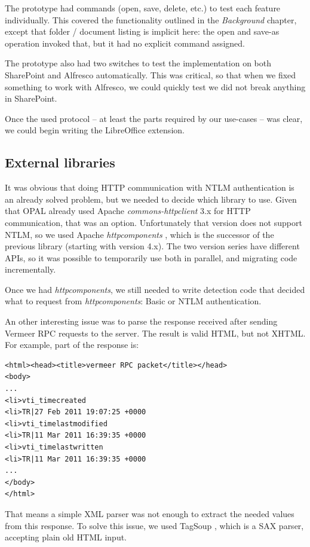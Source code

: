The prototype had commands (open, save, delete, etc.) to test each feature
individually.  This covered the functionality outlined in the \emph{Background}
chapter, except that folder / document listing is implicit here: the open and
save-as operation invoked that, but it had no explicit command assigned.

The prototype also had two switches to test the implementation on both
SharePoint and Alfresco automatically. This was critical, so that when we fixed
something to work with Alfresco, we could quickly test we did not break
anything in SharePoint.

Once the used protocol -- at least the parts required by our use-cases -- was
clear, we could begin writing the LibreOffice extension.

\subsection{External libraries}

It was obvious that doing HTTP communication with NTLM authentication is an
already solved problem, but we needed to decide which library to use. Given that
OPAL already used Apache \emph{commons-httpclient} \cite{httpclient} 3.x for
HTTP communication, that was an option. Unfortunately that version does not support NTLM, so we used
Apache \emph{httpcomponents} \cite{httpcomponents}, which is the successor of
the previous library (starting with version 4.x). The two version series have
different APIs, so it was possible to temporarily use both in parallel, and migrating code
incrementally.

Once we had \emph{httpcomponents}, we still needed to write detection code that
decided what to request from \emph{httpcomponents}: Basic or NTLM
authentication.

An other interesting issue was to parse the response received after sending
Vermeer RPC requests to the server. The result is valid HTML, but not XHTML.
For example, part of the response is:

\begin{lstlisting}
<html><head><title>vermeer RPC packet</title></head>
<body>
...
<li>vti_timecreated
<li>TR|27 Feb 2011 19:07:25 +0000
<li>vti_timelastmodified
<li>TR|11 Mar 2011 16:39:35 +0000
<li>vti_timelastwritten
<li>TR|11 Mar 2011 16:39:35 +0000
...
</body>
</html>\end{lstlisting}

That means a simple XML parser was not enough to extract the needed values from
this response. To solve this issue, we used TagSoup \cite{tagsoup}, which is a
SAX parser, accepting plain old HTML input.

